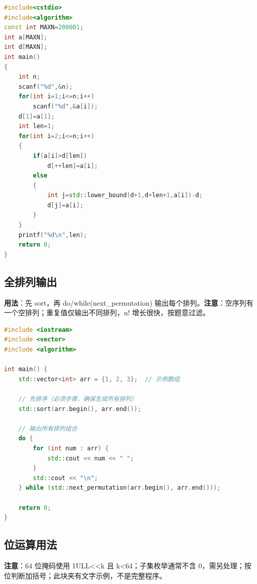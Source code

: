 \documentclass[a4paper,9pt]{extarticle}
\begin{document}
\begin{lstlisting}[language={C++}]
#include<cstdio>
#include<algorithm>
const int MAXN=200001;
int a[MAXN];
int d[MAXN];
int main()
{
    int n;
    scanf("%d",&n);
    for(int i=1;i<=n;i++)
        scanf("%d",&a[i]);
    d[1]=a[1];
    int len=1;
    for(int i=2;i<=n;i++)
    {
        if(a[i]>d[len])
            d[++len]=a[i];
        else
        {
            int j=std::lower_bound(d+1,d+len+1,a[i])-d;
            d[j]=a[i]; 
        }
    }
    printf("%d\n",len);    
    return 0;
}
\end{lstlisting}

\subsection{全排列输出}

\textbf{用法}：先 sort，再 do/\allowbreak{}while(\allowbreak{}next\_\allowbreak{}permutation) 输出每个排列。\textbf{注意}：空序列有一个空排列；重复值仅输出不同排列，n! 增长很快，按题意过滤。

\begin{lstlisting}[language={C++}]
#include <iostream>
#include <vector>
#include <algorithm>

int main() {
    std::vector<int> arr = {1, 2, 3};  // 示例数组
    
    // 先排序（必须步骤，确保生成所有排列）
    std::sort(arr.begin(), arr.end());
    
    // 输出所有排列组合
    do {
        for (int num : arr) {
            std::cout << num << " ";
        }
        std::cout << "\n";
    } while (std::next_permutation(arr.begin(), arr.end()));
    
    return 0;
}
\end{lstlisting}

\subsection{位运算用法}

\textbf{注意}：64 位掩码使用 1ULL<<k 且 k<\allowbreak{}64；子集枚举通常不含 0，需另处理；按位判断加括号；此块夹有文字示例，不是完整程序。
\end{document}
